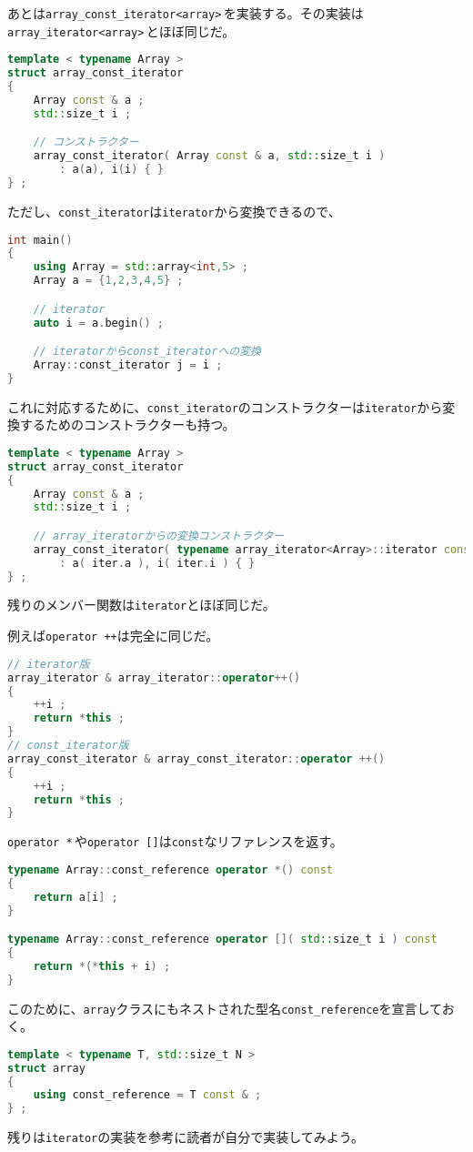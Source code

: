 あとは\texttt{array\_const\_iterator<array>}\,を実装する。その実装は\texttt{array\_iterator<array>}\,とほぼ同じだ。

\begin{lstlisting}[language={C++}]
template < typename Array >
struct array_const_iterator
{
    Array const & a ;
    std::size_t i ;

    // コンストラクター
    array_const_iterator( Array const & a, std::size_t i )
        : a(a), i(i) { }
} ;
\end{lstlisting}

ただし、\texttt{const\_iterator}は\texttt{iterator}から変換できるので、

\begin{lstlisting}[language={C++}]
int main()
{
    using Array = std::array<int,5> ;
    Array a = {1,2,3,4,5} ;

    // iterator
    auto i = a.begin() ;

    // iteratorからconst_iteratorへの変換
    Array::const_iterator j = i ;
}
\end{lstlisting}

これに対応するために、\texttt{const\_iterator}のコンストラクターは\texttt{iterator}から変換するためのコンストラクターも持つ。

\begin{lstlisting}[language={C++}]
template < typename Array >
struct array_const_iterator
{
    Array const & a ;
    std::size_t i ;

    // array_iteratorからの変換コンストラクター
    array_const_iterator( typename array_iterator<Array>::iterator const & iter )
        : a( iter.a ), i( iter.i ) { }
} ;
\end{lstlisting}

残りのメンバー関数は\texttt{iterator}とほぼ同じだ。

例えば\texttt{operator ++}は完全に同じだ。

\ifTombow\pagebreak\fi
\begin{lstlisting}[language={C++}]
// iterator版
array_iterator & array_iterator::operator++()
{
    ++i ;
    return *this ;
}
// const_iterator版
array_const_iterator & array_const_iterator::operator ++()
{
    ++i ;
    return *this ;
}
\end{lstlisting}

\texttt{operator *}\,や\texttt{operator []}は\texttt{const}なリファレンスを返す。

\begin{lstlisting}[language={C++}]
typename Array::const_reference operator *() const
{
    return a[i] ;
}

typename Array::const_reference operator []( std::size_t i ) const
{
    return *(*this + i) ;
}
\end{lstlisting}

このために、\texttt{array}クラスにもネストされた型名\texttt{const\_reference}を宣言しておく。

\begin{lstlisting}[language={C++}]
template < typename T, std::size_t N >
struct array
{
    using const_reference = T const & ;
} ;
\end{lstlisting}

残りは\texttt{iterator}の実装を参考に読者が自分で実装してみよう。
